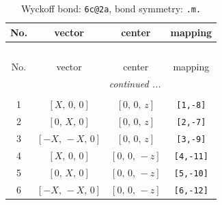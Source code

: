 \documentclass[fleqn,8pt]{jsarticle}
\begin{document}
\renewcommand{\arraystretch}{1.2}
\begin{longtable}{cccc}
\caption{Wyckoff bond: {\tt 6c@2a}, bond symmetry: {\tt .m.}}
 \\
 \hline \hline
No. & vector & center & mapping \\ \hline \endfirsthead

\multicolumn{3}{l}{\tablename\ \thetable{}} \\
 \hline \hline
No. & vector & center & mapping \\ \hline \endhead

 \hline \hline
\multicolumn{3}{r}{\footnotesize\it continued ...} \\ \endfoot

 \hline \hline
\multicolumn{3}{r}{} \\ \endlastfoot

1 & $\left[ X,\, 0,\, 0 \right]$ & $\left[ 0,\, 0,\, z \right]$ & {\tt [1,-8]} \\ \hline
2 & $\left[ 0,\, X,\, 0 \right]$ & $\left[ 0,\, 0,\, z \right]$ & {\tt [2,-7]} \\ \hline
3 & $\left[ - X,\, - X,\, 0 \right]$ & $\left[ 0,\, 0,\, z \right]$ & {\tt [3,-9]} \\ \hline
4 & $\left[ X,\, 0,\, 0 \right]$ & $\left[ 0,\, 0,\, - z \right]$ & {\tt [4,-11]} \\ \hline
5 & $\left[ 0,\, X,\, 0 \right]$ & $\left[ 0,\, 0,\, - z \right]$ & {\tt [5,-10]} \\ \hline
6 & $\left[ - X,\, - X,\, 0 \right]$ & $\left[ 0,\, 0,\, - z \right]$ & {\tt [6,-12]} \\
\end{longtable}
\renewcommand{\arraystretch}{1.2}
\end{document}
